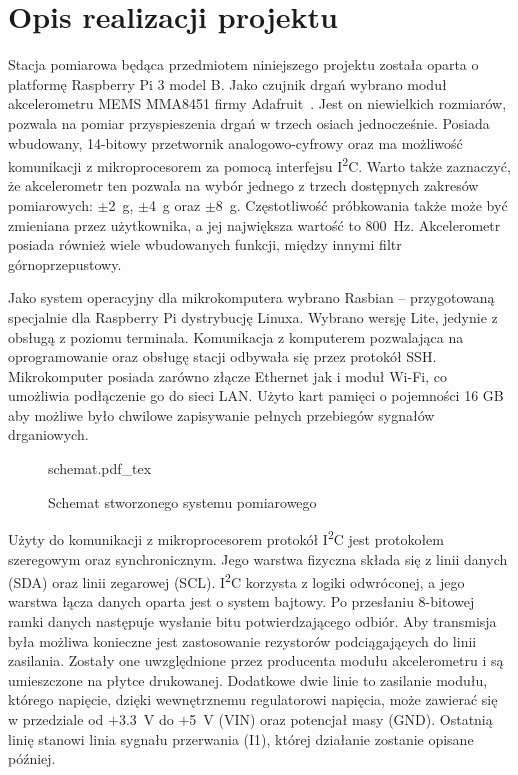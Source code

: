 \documentclass[a4paper,12pt]{mwart}
\let\Oldsection\section
\renewcommand{\section}{\FloatBarrier\Oldsection}
\begin{document}
\section{Opis realizacji projektu}

Stacja pomiarowa będąca przedmiotem niniejszego projektu została oparta o
platformę Raspberry Pi 3 model B. Jako czujnik drgań wybrano moduł
akcelerometru MEMS MMA8451 firmy Adafruit~\cite{mma8451}. Jest on niewielkich
rozmiarów, pozwala na pomiar przyspieszenia drgań w trzech osiach jednocześnie.
Posiada wbudowany, 14-bitowy przetwornik analogowo-cyfrowy oraz ma możliwość
komunikacji z mikroprocesorem za pomocą interfejsu I\textsuperscript{2}C. Warto
także zaznaczyć, że akcelerometr ten pozwala na wybór jednego z trzech
dostępnych zakresów pomiarowych: $\pm$\SI{2}{\g}, $\pm$\SI{4}{\g} oraz
$\pm$\SI{8}{\g}.  Częstotliwość próbkowania także może być zmieniana przez
użytkownika, a jej największa wartość to \SI{800}{\hertz}. Akcelerometr posiada
również wiele wbudowanych funkcji, między innymi filtr górnoprzepustowy.

Jako system operacyjny dla mikrokomputera wybrano Rasbian -- przygotowaną
specjalnie dla Raspberry Pi dystrybucję Linuxa. Wybrano wersję Lite, jedynie z
obsługą z poziomu terminala. Komunikacja z komputerem pozwalająca na
oprogramowanie oraz obsługę stacji odbywała się przez protokół SSH.
Mikrokomputer posiada zarówno złącze Ethernet jak i moduł Wi-Fi, co umożliwia
podłączenie go do sieci LAN. Użyto kart pamięci o pojemności 16 GB aby możliwe
było chwilowe zapisywanie pełnych przebiegów sygnałów drganiowych.

\begin{figure}[!tbh]
  \centering
  {schemat.pdf_tex}
  \caption{Schemat stworzonego systemu pomiarowego}
  \label{fig:schemat}
\end{figure}

Użyty do komunikacji z mikroprocesorem protokół I\textsuperscript{2}C jest
protokołem szeregowym oraz synchronicznym. Jego warstwa fizyczna składa się z
linii danych (SDA) oraz linii zegarowej (SCL). I\textsuperscript{2}C korzysta z
logiki odwróconej, a jego warstwa łącza danych oparta jest o system bajtowy. Po
przesłaniu 8-bitowej ramki danych następuje wysłanie bitu potwierdzającego
odbiór. Aby transmisja była możliwa konieczne jest zastosowanie rezystorów
podciągających do linii zasilania. Zostały one uwzględnione przez producenta
modułu akcelerometru i są umieszczone na płytce drukowanej. Dodatkowe dwie
linie to zasilanie modułu, którego napięcie, dzięki wewnętrznemu regulatorowi
napięcia, może zawierać się w przedziale od $+$\SI{3.3}{\volt} do
$+$\SI{5}{\volt} (VIN) oraz potencjał masy (GND).  Ostatnią linię stanowi linia
sygnału przerwania (I1), której działanie zostanie opisane później.
\end{document}
